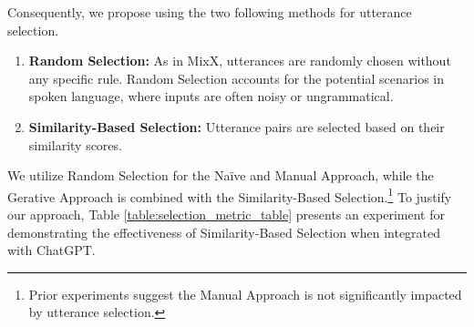 Consequently, we propose using the two following methods for utterance selection. 
\begin{enumerate}
    \item \textbf{Random Selection:}
    As in MixX, utterances are randomly chosen without any specific rule.
    Random Selection accounts for the potential scenarios in spoken language, where inputs are often noisy or ungrammatical.
    \item \textbf{Similarity-Based Selection:}
    Utterance pairs are selected based on their similarity scores.
\end{enumerate}
We utilize Random Selection for the Na\"ive and Manual Approach, while the Gerative Approach is combined with the Similarity-Based Selection.\footnote{
Prior experiments suggest the Manual Approach is not significantly impacted by utterance selection.}
To justify our approach, Table \ref{table:selection_metric_table} presents an experiment for demonstrating the effectiveness of Similarity-Based Selection when integrated with ChatGPT.